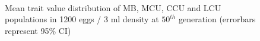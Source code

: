 \begin{figure}[p]
{  }\\
  \caption{Mean trait value distribution of MB, MCU, CCU and LCU populations in 1200 eggs / 3 ml density at $50^{th}$ generation (errorbars represent 95\% CI)}
  \label{fig:lh_ccu_culture}
\end{figure}
